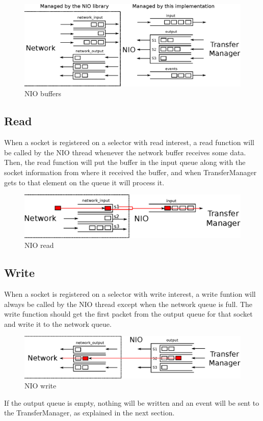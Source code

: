 \documentclass[11pt]{article}
\begin{document}
	\begin{figure}[H]
	\centering
	\includegraphics[width=170mm]{img/drawing3.eps}
	\caption[NIO buffers]{NIO buffers}
	\label{drawing3}
	\end{figure}
	
\subsection{Read}
	When a socket is registered on a selector with read interest, a read function will be called by the NIO thread whenever the network buffer receives some data. Then, the read function will put the buffer in the input queue along with the socket information from where it received the buffer, and when TransferManager gets to that element on the queue it will process it.
	\begin{figure}[H]
	\centering
	\includegraphics[width=160mm]{img/drawing5.eps}
	\caption[NIO read]{NIO read}
	\label{drawing5}
	\end{figure}
	
\subsection{Write}
	When a socket is registered on a selector with write interest, a write funtion will always be called by the NIO thread except when the network queue is full. The write function should get the first packet from the output queue for that socket and write it to the network queue.
	\begin{figure}[H]
	\centering
	\includegraphics[width=170mm]{img/drawing6.eps}
	\caption[NIO write]{NIO write}
	\label{drawing6}
	\end{figure}
	If the output queue is empty, nothing will be written and an event will be sent to the TransferManager, as explained in the next section.
	
\end{document}
